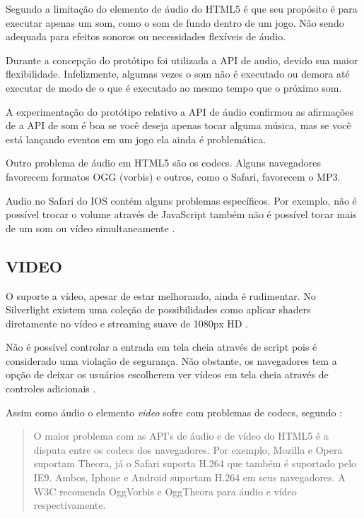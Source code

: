 Segundo \cite{html5mostwanted} a limitação do elemento de áudio do
HTML5 é que seu propósito é para executar apenas um som, como o som
de fundo dentro de um jogo. Não sendo adequada para efeitos sonoros 
ou necessidades flexíveis de áudio.

Durante a concepção do protótipo foi utilizada a API de audio, devido
sua maior flexibilidade. Infelizmente, algumas vezes o som não é
executado ou demora até executar de modo de o que é executado ao mesmo
tempo que o próximo som.

A experimentação do protótipo relativo a API de áudio confirmou as
afirmações de \cite{html5mostwanted} a API de som é boa se você
deseja apenas tocar alguma música, mas se você está lançando eventos
em um jogo ela ainda é problemática.

Outro problema de áudio em HTML5 são os codecs. Alguns navegadores
favorecem formatos OGG (vorbis) e outros, como o Safari, favorecem o
MP3.

Audio no Safari do IOS contém alguns problemas específicos.
Por exemplo, não é possível trocar o volume através de
JavaScript também não é possível tocar mais de um som ou vídeo
simultaneamente \autocite{unsolvedMediaHtmlIssues}.

\subsection{VIDEO}

O suporte a vídeo, apesar de estar melhorando, ainda é rudimentar. No
Silverlight existem uma coleção de possibilidades como aplicar shaders
diretamente no vídeo e streaming suave de 1080px HD \autocite[pp.
8]{researchOnHtml}.

Não é possível controlar a entrada em tela cheia através de script
pois é considerado uma violação de segurança. Não obstante,
os navegadores tem a opção de deixar os usuários escolherem ver
vídeos em tela cheia através de controles adicionais \autocite[pp.
68]{proHtml5}.

Assim como áudio o elemento \textit{video} sofre com problemas de
codecs, segundo \cite{html5Tradeoffs}:
\begin{quote}
O maior problema com as API's de áudio e de vídeo do HTML5 é
a disputa entre os codecs dos navegadores. Por exemplo, Mozilla e
Opera suportam Theora, já o Safari suporta H.264 que também é
suportado pelo IE9. Ambos, Iphone e Android suportam H.264 em seus
navegadores. A W3C recomenda OggVorbis e OggTheora para áudio e vídeo
respectivamente.
\end{quote}

